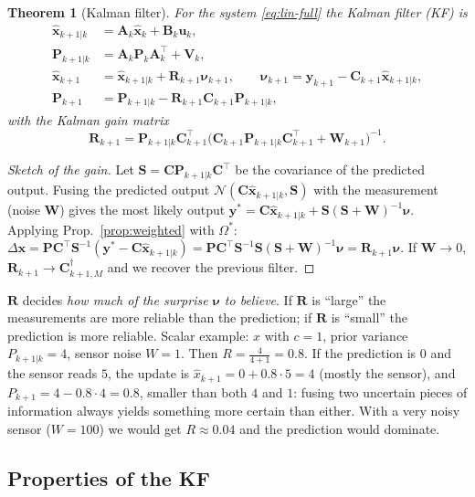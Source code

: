 \documentclass[11pt,a4paper]{article}
\newcommand{\hx}{\hat{\boldsymbol{x}}}
\newcommand{\bx}{\boldsymbol{x}}
\newcommand{\bu}{\boldsymbol{u}}
\newcommand{\by}{\boldsymbol{y}}
\newcommand{\bnu}{\boldsymbol{\nu}}
\newcommand{\mA}{\mathbf{A}}
\newcommand{\mB}{\mathbf{B}}
\newcommand{\mC}{\mathbf{C}}
\newcommand{\mP}{\mathbf{P}}
\newcommand{\mR}{\mathbf{R}}
\newcommand{\mS}{\mathbf{S}}
\newcommand{\mV}{\mathbf{V}}
\newcommand{\mW}{\mathbf{W}}
\newcommand{\pinv}{^{\dagger}}
\newcommand{\tp}{^{\top}}
\theoremstyle{plain}
\newtheorem{theorem}{Theorem}[section]
\theoremstyle{definition}
\theoremstyle{remark}
\begin{document}
\begin{theorem}[Kalman filter]\label{thm:kf}
For the system \eqref{eq:lin-full} the Kalman filter (KF) is
\begin{align}
\hx_{k+1|k}&=\mA_k\hx_k+\mB_k\bu_k,\nonumber\\
\mP_{k+1|k}&=\mA_k\mP_k\mA_k\tp+\mV_k,\nonumber\\
\hx_{k+1}&=\hx_{k+1|k}+\mR_{k+1}\bnu_{k+1},\qquad \bnu_{k+1}=\by_{k+1}-\mC_{k+1}\hx_{k+1|k},\label{eq:kf}\\
\mP_{k+1}&=\mP_{k+1|k}-\mR_{k+1}\mC_{k+1}\mP_{k+1|k},\nonumber
\end{align}
with the \emph{Kalman gain matrix}
\begin{equation}\label{eq:gain}
\mR_{k+1}=\mP_{k+1|k}\mC_{k+1}\tp\big(\mC_{k+1}\mP_{k+1|k}\mC_{k+1}\tp+\mW_{k+1}\big)^{-1}.
\end{equation}
\end{theorem}
\begin{proof}[Sketch of the gain]
Let $\mS=\mC\mP_{k+1|k}\mC\tp$ be the covariance of the predicted output. Fusing the predicted output
$\mathcal N(\mC\hx_{k+1|k},\mS)$ with the measurement (noise $\mW$) gives the most likely output
$\by^*=\mC\hx_{k+1|k}+\mS(\mS+\mW)^{-1}\bnu$. Applying Prop.~\ref{prop:weighted} with $\Omega^*$:
$\Delta\bx=\mP\mC\tp\mS^{-1}(\by^*-\mC\hx_{k+1|k})=\mP\mC\tp\mS^{-1}\mS(\mS+\mW)^{-1}\bnu=\mR_{k+1}\bnu$.
If $\mW\to0$, $\mR_{k+1}\to\mC_{k+1,M}\pinv$ and we recover the previous filter.
\end{proof}

\begin{intuition}
$\mR$ decides \emph{how much of the surprise $\bnu$ to believe}. If $\mR$ is ``large'' the measurements are more reliable than
the prediction; if $\mR$ is ``small'' the prediction is more reliable. Scalar example: $x$ with $c=1$, prior variance
$P_{k+1|k}=4$, sensor noise $W=1$. Then $R=\tfrac{4}{4+1}=0.8$. If the prediction is $0$ and the sensor reads $5$, the update is
$\hat x_{k+1}=0+0.8\cdot5=4$ (mostly the sensor), and $P_{k+1}=4-0.8\cdot4=0.8$, smaller than both $4$ and $1$: fusing two
uncertain pieces of information always yields something more certain than either. With a very noisy sensor ($W=100$) we would get
$R\approx0.04$ and the prediction would dominate.
\end{intuition}

\subsection{Properties of the KF}
\end{document}
